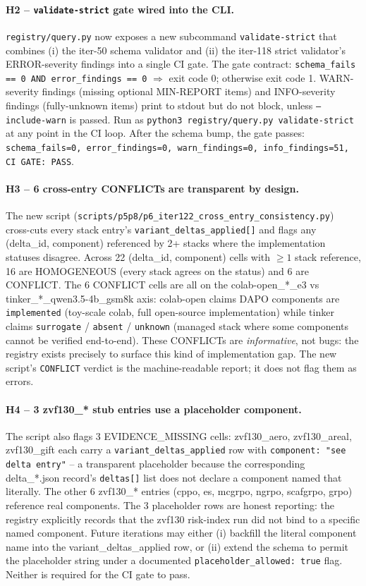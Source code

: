 \paragraph{H2 -- \texttt{validate-strict} gate wired into the CLI.}
\texttt{registry/query.py} now exposes a new subcommand
\texttt{validate-strict} that combines (i) the iter-50 schema validator
and (ii) the iter-118 strict validator's ERROR-severity findings into a
single CI gate. The gate contract: \texttt{schema\_fails == 0 AND
error\_findings == 0} $\Rightarrow$ exit code 0; otherwise exit code 1.
WARN-severity findings (missing optional MIN-REPORT items) and
INFO-severity findings (fully-unknown items) print to stdout but do not
block, unless \texttt{--include-warn} is passed. Run as
\texttt{python3 registry/query.py validate-strict} at any point in the
CI loop. After the schema bump, the gate passes:
\texttt{schema\_fails=0, error\_findings=0, warn\_findings=0,
info\_findings=51, CI GATE: PASS}.

\paragraph{H3 -- 6 cross-entry CONFLICTs are transparent by design.}
The new script
(\texttt{scripts/p5p8/p6\_iter122\_cross\_entry\_consistency.py})
cross-cuts every stack entry's \texttt{variant\_deltas\_applied[]} and
flags any (delta\_id, component) referenced by 2+ stacks where the
implementation statuses disagree. Across 22 (delta\_id, component)
cells with $\geq 1$ stack reference, 16 are HOMOGENEOUS (every stack
agrees on the status) and 6 are CONFLICT. The 6 CONFLICT cells are all
on the colab-open\_*\_e3 vs tinker\_*\_qwen3.5-4b\_gsm8k axis: colab-open
claims DAPO components are \texttt{implemented} (toy-scale colab, full
open-source implementation) while tinker claims
\texttt{surrogate} / \texttt{absent} / \texttt{unknown} (managed stack
where some components cannot be verified end-to-end). These CONFLICTs
are \emph{informative}, not bugs: the registry exists precisely to
surface this kind of implementation gap. The new script's
\texttt{CONFLICT} verdict is the machine-readable report; it does not
flag them as errors.

\paragraph{H4 -- 3 zvf130\_* stub entries use a placeholder component.}
The script also flags 3 EVIDENCE\_MISSING cells: zvf130\_aero,
zvf130\_areal, zvf130\_gift each carry a \texttt{variant\_deltas\_applied}
row with \texttt{component: "see delta entry"} -- a transparent
placeholder because the corresponding delta\_*.json record's
\texttt{deltas[]} list does not declare a component named that
literally. The other 6 zvf130\_* entries
(cppo, es, mcgrpo, ngrpo, scafgrpo, grpo) reference real components.
The 3 placeholder rows are honest reporting: the registry explicitly
records that the zvf130 risk-index run did not bind to a specific named
component. Future iterations may either (i) backfill the literal
component name into the variant\_deltas\_applied row, or (ii) extend
the schema to permit the placeholder string under a documented
\texttt{placeholder\_allowed: true} flag. Neither is required for the
CI gate to pass.

